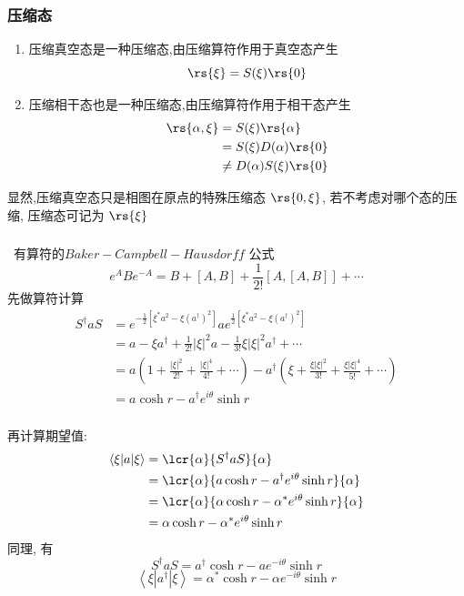 \begin{frame}
 \frametitle{压缩态}
  \begin{enumerate}
      \item 压缩真空态是一种压缩态,由压缩算符作用于真空态产生
     \[ \rs{\xi } = S(\xi) \rs{0 }  \]
      \item 压缩相干态也是一种压缩态,由压缩算符作用于相干态产生
    \[\begin{aligned}
          \rs{\alpha,\xi } &= S(\xi) \rs{\alpha } \\ 
          &=  S(\xi) D(\alpha) \rs{0} \\
          & \not = D(\alpha)S(\xi) \rs{0} 
    \end{aligned} \]  
  \end{enumerate}
  显然,压缩真空态只是相图在原点的特殊压缩态 $ \rs{0,\xi } $, 若不考虑对哪个态的压缩, 压缩态可记为 $\rs{\xi }$
\end{frame}

\begin{frame}
    \frametitle{}
    \例 [2. 试证明产生湮灭算符对压缩态的期望值为]{
    \[ \langle\xi|a| \xi\rangle=\alpha \cosh r- \alpha^{*}  e^{i\theta}\sinh r , \quad \left\langle\xi\left|a^{\dagger}\right| \xi\right\rangle=\alpha^{*} \cosh r -\alpha  e^{-i\theta}\sinh r \]
    } 
    \证 ~有算符的$Baker-Campbell-Hausdorff$ 公式
    \[ e^A B e^{-A} = B+ [A,B] + \frac{1}{2!}[A,[A,B]] + \cdots \]
    先做算符计算
    \[\begin{aligned}
        S^\dagger a S &= e^{-\frac{1}{2}[\xi^* a^2 - \xi (a^{\dagger}) ^2]} a  e^{\frac{1}{2}[\xi^* a^2 - \xi (a^{\dagger}) ^2]} \\ 
        &=  a -\xi a^\dagger + \frac{1}{2!} \left|\xi\right|^2 a - \frac{1}{3!} \xi \left|\xi\right|^2 a^\dagger + \cdots \\  
        &=  a \left( 1 + \frac{\left|\xi\right|^2 }{2!} + \frac{\left|\xi\right|^4}{4!} + \cdots\right) - a^\dagger \left(  \xi  + \frac{\xi \left|\xi\right|^2}{3!} +   \frac{\xi \left|\xi\right|^4}{5!} + \cdots \right)\\ 
        &= a \cosh r- a^{\dagger}  e^{i\theta}\sinh r 
  \end{aligned} \]      
   \end{frame}

   \begin{frame}
    \frametitle{}
    再计算期望值:
    \[\begin{aligned}
        \langle\xi |a| \xi\rangle &= \lcr {\alpha} {S^\dagger a S}{\alpha}  \\ 
        &= \lcr {\alpha} { a \cosh r- a^{\dagger}  e^{i\theta}\sinh r}{\alpha}  \\ 
        &= \lcr {\alpha} {\alpha \cosh r- \alpha^{*}  e^{i\theta}\sinh r }{\alpha}  \\ 
        &= \alpha \cosh r- \alpha^{*}  e^{i\theta}\sinh r 
  \end{aligned} \] 
  同理, 有 
  \[  S^\dagger a S = a^{\dagger} \cosh r -a  e^{-i\theta}\sinh r \]
  \[ \left\langle\xi\left|a^{\dagger}\right| \xi\right\rangle=\alpha^{*} \cosh r -\alpha  e^{-i\theta}\sinh r\]
   \end{frame}


